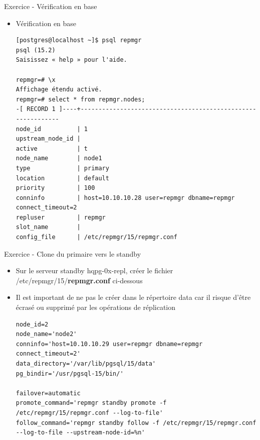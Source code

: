 \begin{frame}[fragile]{Exercice - Vérification en base}

   \begin{itemize}
      \item Vérification en base
\begin{tiny}
\begin{Verbatim}[commandchars=\&\{\}]
[postgres@localhost ~]$ psql repmgr
psql (15.2)
Saisissez « help » pour l'aide.

repmgr=# \x
Affichage étendu activé.
repmgr=# select * from repmgr.nodes;
-[ RECORD 1 ]----+-------------------------------------------------------------
node_id          | 1
upstream_node_id | 
active           | t
node_name        | node1
type             | primary
location         | default
priority         | 100
conninfo         | host=10.10.10.28 user=repmgr dbname=repmgr connect_timeout=2
repluser         | repmgr
slot_name        | 
config_file      | /etc/repmgr/15/repmgr.conf
\end{Verbatim}
\end{tiny}
   \end{itemize}

\begin{toile}
\end{toile}

\end{frame}


\begin{frame}[fragile]{Exercice - Clone du primaire vers le standby}

   \begin{itemize}
      \item Sur le serveur standby hqpg-0x-repl, créer le fichier /etc/repmgr/15/\textbf{repmgr.conf} ci-dessous
      \item Il est important de ne pas le créer dans le répertoire data car il risque d'être écrasé ou supprimé par les opérations de réplication
\begin{tiny}
\begin{Verbatim}[commandchars=\\\{\}]
node_id=2
node_name='node2'
conninfo='host=10.10.10.29 user=repmgr dbname=repmgr connect_timeout=2'
data_directory='/var/lib/pgsql/15/data'
pg_bindir='/usr/pgsql-15/bin/'

failover=automatic
promote_command='repmgr standby promote -f /etc/repmgr/15/repmgr.conf --log-to-file'
follow_command='repmgr standby follow -f /etc/repmgr/15/repmgr.conf --log-to-file --upstream-node-id=%n'
\end{Verbatim}
\end{tiny}
   \end{itemize}

\begin{toile}
\end{toile}

\end{frame}

